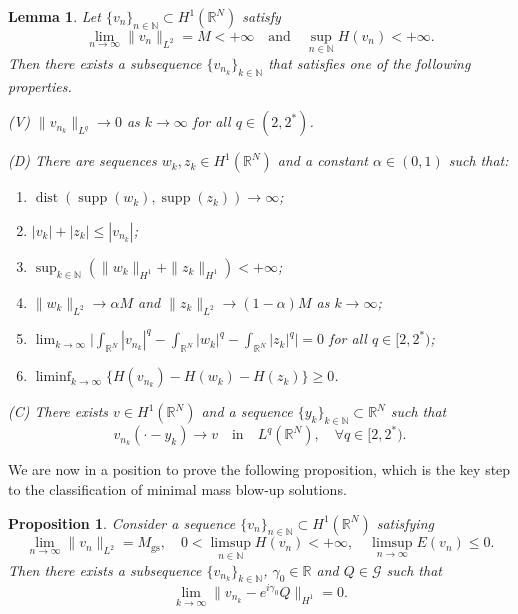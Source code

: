 \documentclass[reqno]{amsart}
\newcommand{\real}{\mathbb{R}}
\newcommand{\nat}{\mathbb{N}}
\newcommand{\rn}{\real^N}
\newcommand{\N}{\mathbb{N}}
\newcommand{\R}{\mathbb{R}}
\let\le=\leqslant
\let\ge= \geqslant
\DeclareMathOperator \dist{dist}
\DeclareMathOperator \supp{supp}
\theoremstyle{plain}
\newtheorem{lemma}{Lemma}
\newtheorem{proposition}{Proposition}
\theoremstyle{definition}
\numberwithin{equation}{section}
\begin{document}
\begin{lemma}\label{conc-comp.lemma}
Let $\{v_n\}_{n\in \N}\subset H^1(\rn)$ satisfy
\[
\lim_{n \rightarrow\infty}\|v_n\|_{L^2}=M<+\infty \quad \text{and} \quad \sup_{n\in\N} H(v_n) <+\infty.
\]
Then there exists a subsequence $\{v_{n_k}\}_{k\in \N}$ that satisfies one of the following properties.

\medskip
\noindent
(V) $\|v_{n_k}\|_{L^q}\rightarrow 0$ as $k\rightarrow\infty$ for all $q\in(2,2^*)$.

\medskip
\noindent
(D) There are sequences ${w_k},{z_k}\in H^1(\rn)$ and a constant $\alpha\in (0,1)$ such that:
\begin{enumerate}
\item $\dist(\supp(w_k),\supp(z_k))\rightarrow\infty$;
\item $|v_k|+|z_k|\le |v_{n_k}|$;
\item $\sup_{k\in\N} (\|w_k\|_{H^1}+\|z_k\|_{H^1})<+\infty$;
\item $\|w_k\|_{L^2}\rightarrow\alpha M$ and $\|z_k\|_{L^2}\to (1-\alpha)M$ as $k\rightarrow\infty$;
\item $\lim_{k\rightarrow\infty}\big| \int_{\rn}|v_{n_k}|^q-\int_{\rn}|w_k|^q-\int_{\rn}|z_k|^q\big|=0$ 
for all $q\in[2,2^*)$;
\item $\liminf_{k\rightarrow\infty}\big\{  H(v_{n_k})-H(w_k)-H(z_k) \big\}\ge 0$.
\end{enumerate} 

\medskip
\noindent
(C) There exists $v\in H^1(\rn)$ and a sequence $\{y_k\}_{k\in\N}\subset \rn$ such that
\[
v_{n_k}(\cdot -y_k)\rightarrow v \quad \text{in} \quad L^q(\rn), \quad \forall q\in[2,2^*).
\]
\end{lemma}

We are now in a position to prove the following proposition, which is the key step
to the classification of minimal mass blow-up solutions. 

\begin{proposition}\label{compact.prop}
Consider a sequence $\{v_n\}_{n\in\nat}\subset H^1(\rn)$ satisfying
\begin{equation} \label{a}
\lim_{n\rightarrow\infty}\|v_n\|_{L^2}=M_\mathrm{gs}, \quad 0<\limsup_{n\in\N}H(v_n)<+\infty,
\quad \limsup_{n\rightarrow\infty}E(v_n)\le 0.
\end{equation}
Then there exists a subsequence $\{v_{n_k}\}_{k\in\nat}$, $\gamma_0\in\R$ and $Q\in\mathcal{G}$ such that
\begin{equation}\label{compact}
\lim_{k\rightarrow\infty}\|v_{n_k}-e^{i\gamma_0}Q\|_{H^1}=0.
\end{equation}
\end{proposition}
\end{document}
